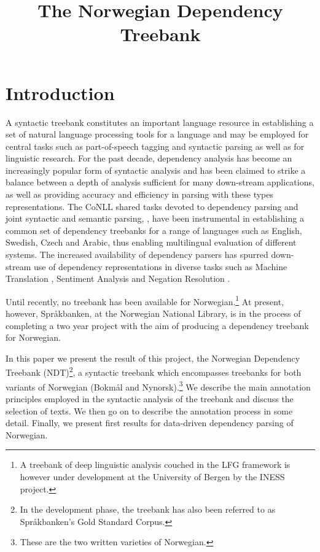 \documentclass[10pt,a4paper]{article}
\title{The Norwegian Dependency Treebank}
\date{}
\begin{document}
\maketitleabstract

\section{Introduction}
A syntactic treebank constitutes an important language resource in
establishing a set of natural language processing tools for a
language and may be employed for central tasks such as part-of-speech
tagging and syntactic parsing as well as for linguistic research. For the past decade, dependency
analysis has become an increasingly popular form of syntactic analysis
and has been claimed to strike a balance between a depth of analysis
sufficient for many down-stream applications, as well as providing accuracy and
efficiency in parsing with these types representations. The CoNLL
shared tasks devoted to dependency parsing and joint syntactic and
semantic parsing,
\cite{Niv:Hal:Kub:07,Haj:Cia:Joh:09}, have been instrumental in
establishing a common set of dependency treebanks for a range of
languages such as English, Swedish, Czech and Arabic, %
thus enabling multilingual evaluation of different systems.  The increased
availability of dependency parsers has spurred down-stream use of
dependency representations in diverse tasks such as Machine Translation \cite{Din:Pal:05}, Sentiment Analysis \cite{Wil:Wie:Hof:09} and Negation Resolution \cite{Lap:Vel:Ovr:12}.

Until recently, no treebank has been available for
Norwegian.\footnote{A treebank of deep linguistic analysis couched in
  the LFG framework is however under development at the University of Bergen
  by the INESS project.}
At present, however, Spr{\aa}kbanken, at the Norwegian National Library,
is in the process of completing a two year project with the aim of
producing a dependency treebank for Norwegian.

In this paper we present the result of this project, the Norwegian
Dependency Treebank (NDT)\footnote{In the development phase, the treebank has also been referred to as Språkbanken's Gold Standard Corpus.}, a syntactic treebank which encompasses
treebanks for both variants of Norwegian (Bokm{\aa}l and
Nynorsk).\footnote{These are the two written varieties of Norwegian.}
We describe the main annotation principles employed
in the syntactic analysis of the treebank and discuss the selection of
texts. We then go on to describe the annotation process in some
detail. Finally, we present first results for data-driven dependency
parsing of Norwegian.
\end{document}
